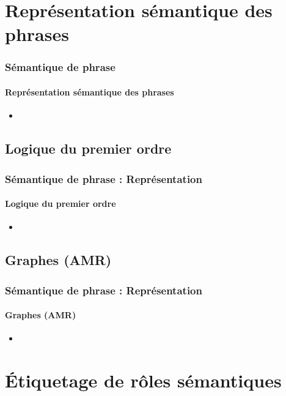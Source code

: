 \documentclass[xcolor=table]{beamer}
\begin{document}
\section{Représentation sémantique des phrases}

\begin{frame}
	\frametitle{Sémantique de phrase}
	\framesubtitle{Représentation sémantique des phrases}
	
	\begin{itemize}
		\item 
	\end{itemize}
	
\end{frame}

\subsection{Logique du premier ordre}

\begin{frame}
	\frametitle{Sémantique de phrase : Représentation}
	\framesubtitle{Logique du premier ordre}
	
	\begin{itemize}
		\item 
	\end{itemize}
	
\end{frame}

\subsection{Graphes (AMR)}

\begin{frame}
	\frametitle{Sémantique de phrase : Représentation}
	\framesubtitle{Graphes (AMR)}
	
	\begin{itemize}
		\item 
	\end{itemize}
	
\end{frame}

\section{Étiquetage de rôles sémantiques}
\end{document}
